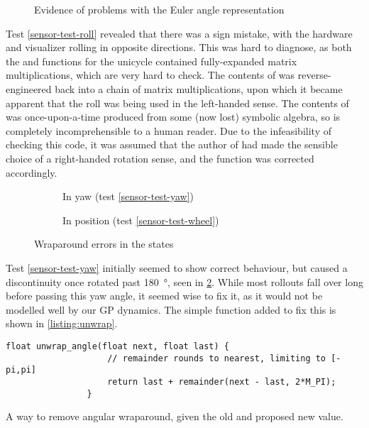 \documentclass[main.tex]{subfiles}
\begin{document}
		\begin{figure}
			\caption{Evidence of problems with the Euler angle representation}
			\label{fig:bad-euler}
		\end{figure}

		Test \ref{sensor-test-roll} revealed that there was a sign mistake, with the hardware and visualizer rolling in opposite directions.
		This was hard to diagnose, as both the  and  functions for the unicycle contained fully-expanded matrix multiplications, which are very hard to check.
		The contents of  was reverse-engineered back into a chain of matrix multiplications, upon which it became apparent that the roll was being used in the left-handed sense.
		The contents of  was once-upon-a-time produced from some (now lost) symbolic algebra, so is completely incomprehensible to a human reader.
		Due to the infeasibility of checking this code, it was assumed that the author of  had made the sensible choice of a right-handed rotation sense, and the  function was corrected accordingly.


		\begin{figure}
			\begin{subfigure}[t]{0.3\linewidth}
				\caption{In yaw (test \cref{sensor-test-yaw})}
				\label{fig:bad-yaw}
			\end{subfigure}
			\begin{subfigure}[t]{0.3\linewidth}
				\caption{In position (test \cref{sensor-test-wheel})}
				\label{fig:bad-wheel}
			\end{subfigure}
			\caption{Wraparound errors in the states}
		\end{figure}


		Test \cref{sensor-test-yaw} initially seemed to show correct behaviour, but caused a discontinuity once rotated past \SI{180}{\degree}, seen in \cref{fig:bad-yaw}.
		While most rollouts fall over long before passing this yaw angle, it seemed wise to fix it, as it would not be modelled well by our GP dynamics.
		The simple function added to fix this is shown in \cref{listing:unwrap}.

		\begin{listingfloat}
			\begin{lstlisting}[language={[11]C++}, gobble=8, frame=single]
				float unwrap_angle(float next, float last) {
					// remainder rounds to nearest, limiting to [-pi,pi]
					return last + remainder(next - last, 2*M_PI);
				}
			\end{lstlisting}
			\caption{A way to remove angular wraparound, given the old and proposed new value.}
			\label{listing:unwrap}
		\end{listingfloat}
\end{document}
